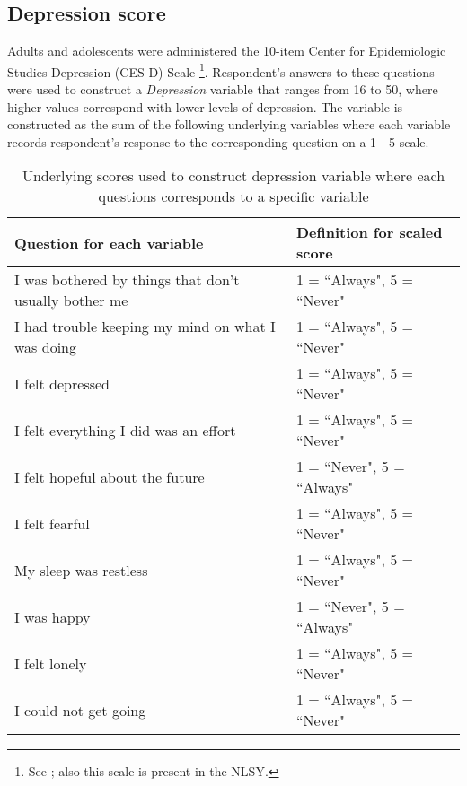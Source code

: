 \subsection{Depression score}
Adults and adolescents were administered the 10-item Center for Epidemiologic Studies Depression (CES-D) Scale \footnote{See \cite{Radloff1977}; also this scale is present in the NLSY.}. Respondent's answers to these questions were used to construct a \textit{Depression} variable that ranges from 16 to 50, where higher values correspond with lower levels of depression. The variable is constructed as the sum of the following underlying variables where each variable records respondent's response to the corresponding question on a 1 - 5 scale. \\

\begin{table}[H]
\begin{center}
\footnotesize{
\caption{Underlying scores used to construct depression variable where each questions corresponds to a specific variable}
	\begin{tabular}{L{8.5cm} l}
	\hline
	\textbf{Question for each variable}	 					& \textbf{Definition for scaled score} \\
	\hline
	I was bothered by things that don’t usually bother me	& 1 = ``Always", 5 = ``Never"  \\	
	I had trouble keeping my mind on what I was doing	& 1 = ``Always", 5 = ``Never"  	\\
	I felt depressed											& 1 = ``Always", 5 = ``Never"	 \\
	I felt everything I did was an effort						& 1 = ``Always", 5 = ``Never"	 \\
	I felt hopeful about the future							& 1 = ``Never",  5 = ``Always"	 \\
	I felt fearful 												& 1 = ``Always", 5 = ``Never"	\\ 
	My sleep was restless										& 1 = ``Always", 5 = ``Never" \\
	I was happy												& 1 = ``Never", 5 = ``Always" \\
	I felt lonely												& 1 = ``Always", 5 = ``Never"  \\
	I could not get going 										& 1 = ``Always",  5 = ``Never" \\
	
	\hline
	
	\end{tabular}
}

\end{center}
\end{table}
\clearpage


